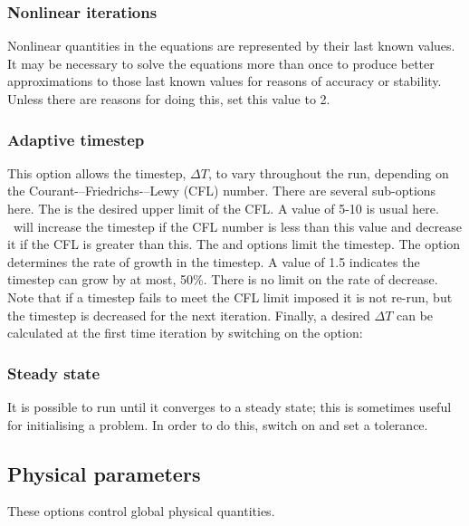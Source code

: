 \subsubsection{Nonlinear iterations}
Nonlinear quantities in the equations are represented by their last known
values. It may be necessary to solve the equations more than once to produce
better approximations to those last known values for reasons of accuracy or
stability. Unless there are reasons for doing this, set this value to 2.

\subsubsection{Adaptive timestep}
\label{section:config_adaptive_timestep}
This option allows the timestep, $\Delta T$, to vary throughout the run, depending on the 
Courant-–Friedrichs-–Lewy (CFL) number.  There are several sub-options here. The
 is the desired upper limit of the CFL. A value of 5-10 is usual
here. \fluidity\ will increase the timestep if the CFL number is less than this value and decrease
it if the CFL is greater than this. The  and 
 options limit the timestep. The option 
 determines
the rate of growth in the timestep. A value of 1.5 indicates the timestep can grow by
at most, 50\%. There is no limit on the rate of decrease. Note that if a timestep fails
to meet the CFL limit imposed it is not re-run, but the timestep is decreased for the next
iteration. Finally, a desired $\Delta T$ can be calculated at the first time iteration by
switching on the option: 

\subsubsection{Steady state}
It is possible to run \fluidity until it converges to a steady state; this is sometimes useful for initialising a problem. In order to do this, switch on  and set a tolerance. 

\subsection{Physical parameters}
These options control global physical quantities.

